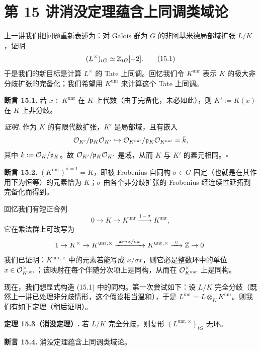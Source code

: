 \section*{第 15 讲\quad 消没定理蕴含上同调类域论}

上一讲我们把问题重新表述为：对 Galois 群为 $G$ 的非阿基米德局部域扩张 $L/K$，证明
\begin{equation}
(L^{\times})_{tG}\simeq\mathbb{Z}_{tG}[-2]. \tag{15.1}
\end{equation}
于是我们的新目标是计算 $L^{\times}$ 的 Tate 上同调。回忆我们令 $K^{\mathrm{unr}}$ 表示 $K$ 的极大非分歧扩张的完备化；我们希望用 $K^{\mathrm{unr}}$ 来计算这个 Tate 上同调。

\textbf{断言 15.1.} 若 $x\in K^{\mathrm{unr}}$ 在 $K$ 上代数（由于完备化，未必如此），则 $K':=K(x)$ 在 $K$ 上非分歧。

\textit{证明.} 作为 $K$ 的有限代数扩张，$K'$ 是局部域，且有嵌入
\[
\mathcal{O}_{K'}/\mathfrak{p}_{K}\mathcal{O}_{K'}\hookrightarrow\mathcal{O}_{K^{\mathrm{unr}}}/\mathfrak{p}_{K}\mathcal{O}_{K^{\mathrm{unr}}}=\bar k,
\]
其中 $k:=\mathcal{O}_{K}/\mathfrak{p}_{K}$。故 $\mathcal{O}_{K'}/\mathfrak{p}_{K}\mathcal{O}_{K'}$ 是域，从而 $K$ 与 $K'$ 的素元相同。\hfill$\square$

\textbf{断言 15.2.} $(K^{\mathrm{unr}})^{\sigma=1}=K$，即被 Frobenius 自同构 $\sigma\in G$ 固定（也就是在其作用下为恒等）的元素恰为 $K$；$\sigma$ 由各个非分歧扩张的 Frobenius 经连续性延拓到完备化而得到。

回忆我们有短正合列
\[
0\to K\to K^{\mathrm{unr}}\xrightarrow{\ 1-\sigma\ }K^{\mathrm{unr}},
\]
它在乘法群上可改写为
\[
1\to K^{\times}\to K^{\mathrm{unr},\times}\xrightarrow{\ x\mapsto x/\sigma x\ }K^{\mathrm{unr},\times}\xrightarrow{\ v\ }\Z\to 0.
\]
我们已证明：$K^{\mathrm{unr},\times}$ 中的元素若能写成 $x/\sigma x$，则它必是整数环中的单位 $x\in\mathcal{O}_{K^{\mathrm{unr}}}^{\times}$；该映射在每个伴随分次项上是同构，从而在 $\mathcal{O}_{K^{\mathrm{unr}}}^{\times}$ 上是同构。

现在，我们想显式构造 (15.1) 中的同构。第一次尝试如下：设 $L/K$ 完全分歧（既然上一讲已处理非分歧情形，这个假设相当温和），于是 $L^{\mathrm{unr}}=L\otimes_{K}K^{\mathrm{unr}}$。则我们有如下定理（稍后证明）。

\textbf{定理 15.3（消没定理）.} 若 $L/K$ 完全分歧，则复形 $(L^{\mathrm{unr},\times})_{tG}$ 无环。

\textbf{断言 15.4.} 消没定理蕴含上同调类域论。

